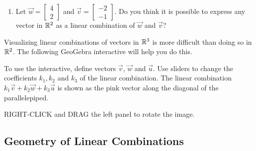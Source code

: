 \documentclass{ximera}
\begin{document}
\begin{exploration}
\begin{enumerate}
\item Let $\vec{w}=\begin{bmatrix}4\\2\end{bmatrix}$ and $\vec{v}=\begin{bmatrix}-2\\-1\end{bmatrix}$.  Do you think it is possible to express any vector in $\mathbb{R}^2$ as a linear combination of $\vec{w}$ and $\vec{v}$?  
\end{enumerate}
    
\end{exploration}
Visualizing linear combinations of vectors in $\mathbb{R}^3$ is more difficult than doing so in $\mathbb{R}^2$.  The following GeoGebra interactive will help you do this.

\begin{exploration}\label{exp:linCombR3}
To use the interactive, define vectors $\vec{v}$, $\vec{w}$ and $\vec{u}$.  Use sliders to change the coefficients $k_1, k_2$ and $k_3$ of the linear combination.  The linear combination $k_1\vec{v}+k_2\vec{w}+k_3\vec{u}$ is shown as the pink vector along the diagonal of the parallelepiped. 

RIGHT-CLICK and DRAG the left panel to rotate the image.
\begin{center} 
\end{center}
\end{exploration}

\subsection*{Geometry of Linear Combinations}
\end{document}
